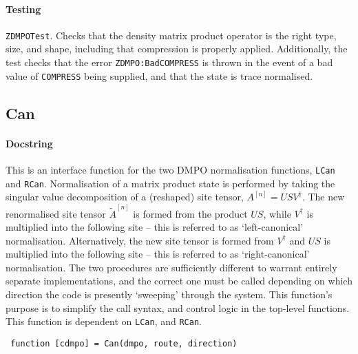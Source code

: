  \paragraph{Testing} \lstinline$ZDMPOTest$. Checks that the density matrix product operator is the right type, size, and shape, including that compression is properly applied. Additionally, the test checks that the error \lstinline$ZDMPO:BadCOMPRESS$ is thrown in the event of a bad value of \lstinline$COMPRESS$ being supplied, and that the state is trace normalised.

 \subsection{Can}
 \paragraph{Docstring} This is an interface function for the two DMPO normalisation functions, \lstinline$LCan$ and \lstinline$RCan$. Normalisation of a matrix product state is performed by taking the singular value decomposition of a (reshaped) site tensor, \(A^{[n]} = USV^{\dagger}\). The new renormalised site tensor \(\tilde{A}^{[n]}\) is formed from the product \(US\), while \(V^{\dagger}\) is multiplied into the following site -- this is referred to as `left-canonical' normalisation. Alternatively, the new site tensor is formed from \(V^{\dagger}\) and \(US\) is multiplied into the following site -- this is referred to as `right-canonical' normalisation. The two procedures are sufficiently different to warrant entirely separate implementations, and the correct one must be called depending on which direction the code is presently `sweeping' through the system. This function's purpose is to simplify the call syntax, and control logic in the top-level functions. This function is dependent on \lstinline$LCan$, and \lstinline$RCan$.
 \begin{lstlisting}
 function [cdmpo] = Can(dmpo, route, direction) \end{lstlisting}
